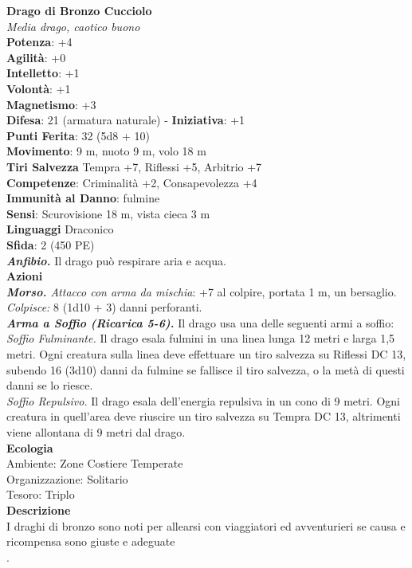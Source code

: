 \begin{multicols}{2}
\medskip\textbf{Drago di Bronzo Cucciolo}\\
\emph{Media drago, caotico buono}\\
\textbf{Potenza}: +4\\
\textbf{Agilità}: +0\\
\textbf{Intelletto}: +1\\
\textbf{Volontà}: +1\\
\textbf{Magnetismo}: +3\\
\textbf{Difesa}: 21 (armatura naturale) - \textbf{Iniziativa}: +1\\
\textbf{Punti Ferita}: 32 (5d8 + 10)\\
\textbf{Movimento}: 9 m, nuoto 9 m, volo 18 m\\
\textbf{Tiri Salvezza} Tempra +7, Riflessi +5, Arbitrio +7\\
\textbf{Competenze}: Criminalità +2, Consapevolezza +4\\
\textbf{Immunità al Danno}: fulmine\\
\textbf{Sensi}: Scurovisione 18 m, vista cieca 3 m\\
\textbf{Linguaggi} Draconico\\
\textbf{Sfida}: 2 (450 PE)\smallskip\\
\emph{\textbf{Anfibio.}} Il drago può respirare aria e acqua.\\
\smallskip\textbf{Azioni}\\
\emph{\textbf{Morso.} Attacco con arma da mischia}: +7 al colpire, portata 1 m, un bersaglio.\\
\emph{Colpisce:} 8 (1d10 + 3) danni perforanti.\\
\emph{\textbf{Arma a Soffio (Ricarica 5-6).}} Il drago usa una delle seguenti armi a soffio:\\
\emph{Soffio Fulminante.} Il drago esala fulmini in una linea lunga 12 metri e larga 1,5 metri. Ogni creatura sulla linea deve effettuare un tiro salvezza su Riflessi DC  13, subendo 16 (3d10) danni da fulmine se fallisce il tiro salvezza, o la metà di questi danni se lo riesce.\\
\emph{Soffio Repulsivo.} Il drago esala dell'energia repulsiva in un cono di 9 metri. Ogni creatura in quell'area deve riuscire un tiro salvezza su Tempra DC  13, altrimenti viene allontana di 9 metri dal drago.\\
\textbf{Ecologia}\\
Ambiente: Zone Costiere Temperate\\
Organizzazione: Solitario\\
Tesoro: Triplo\\
\textbf{Descrizione}\\
I draghi di bronzo sono noti per allearsi con viaggiatori ed avventurieri se causa e ricompensa sono giuste e adeguate\\
.


\end{multicols}
